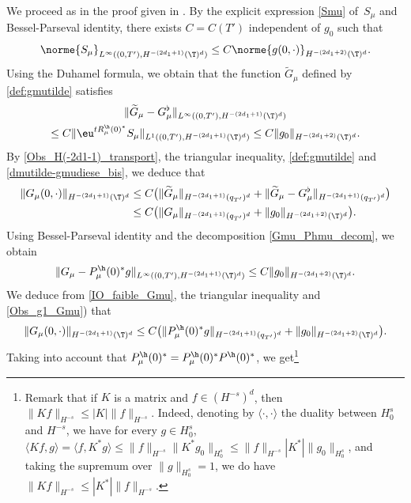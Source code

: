 We proceed as in the proof given in .
By the explicit expression \eqref{Smu} of~$S_\mu$ and Bessel-Parseval identity, there exists $C=C(T')$ independent of $g_0$ such that
\begin{equation}
\label{defsourcecompBis}
\norme{S_\mu}_{L^\infty((0,T'),H^{-(2d_1+1)}(\T)^d)} \leq C \norme{ g(0,\cdot)}_{H^{-(2d_1+2)}(\T)^d}.
\end{equation}
Using the Duhamel formula, we obtain that the function $\widetilde{G}_\mu$ defined by \eqref{def:gmutilde} satisfies
\begin{multline}
\| \widetilde{G}_\mu - G_\mu^\flat \|_{L^\infty((0,T'),H^{-(2d_1+1)}(\T)^d)}\\
\leq C \| \eu^{t R_{\mu}^{\h}(0)^*} S_\mu \|_{L^1((0,T'),H^{-(2d_1+1)}(\T)^d)} \leq C
\| g_0 \|_{H^{-(2d_1+2)}(\T)^d}.
\label{dmutilde-gmudiese_bis}
\end{multline}
By \eqref{Obs_H(-2d1-1)_transport}, the triangular inequality, \eqref{def:gmutilde} and \eqref{dmutilde-gmudiese_bis}, we deduce that
\begin{equation} \label{IO_faible_Gmu}
\begin{aligned}
\| G_\mu(0,\cdot) \|_{H^{-(2d_1+1)}(\T)^d}
& \leq C \bigl(\| \widetilde{G}_\mu \|_{H^{-(2d_1+1)}(q_{T'})^d} + \| \widetilde{G}_\mu - G_\mu^\flat \|_{H^{-(2d_1+1)}(q_{T'})^d} \bigr) \\
& \leq C \bigl(\|G_\mu\|_{H^{-(2d_1+1)}(q_{T'})^d}+ \| g_0 \|_{H^{-(2d_1+2)}(\T)^d}
\bigr).
\end{aligned}
\end{equation}
Using Bessel-Parseval identity and the decomposition \eqref{Gmu_Phmu_decom}, we obtain
\begin{equation} \label{Obs_g1_Gmu}
\|G_{\mu} -P^\h_\mu(0)^* g \|_{L^\infty((0,T'),H^{-(2d_1+1)}(\T)^d)} \leq C \| g_0\|_{H^{-(2d_1+2)}(\T)^d}.
\end{equation}
We deduce from \eqref{IO_faible_Gmu}, the triangular inequality and \eqref{Obs_g1_Gmu}) that
\[
\| G_\mu(0,\cdot) \|_{H^{-(2d_1+1)}(\T)^d} \leq C \bigl(
\| P^\h_\mu(0)^* g \|_{H^{-(2d_1+1)}(q_{T'})^d} + \| g_0\|_{H^{-(2d_1+2)}(\T)^d} \bigr).
\]
Taking into account that $P^\h_\mu(0)^*=P^\h_\mu(0)^* P^\h(0)^*$, we get\footnote{Remark that if $K$ is a matrix and $f\in (H^{-s})^d$, then $\|Kf\|_{H^{-s}}\leq |K|\|f\|_{H^{-s}}$. Indeed, denoting by $\langle\cdot,\cdot\rangle$ the duality between $H^s_0$ and $H^{-s}$, we have for every $g\in H^{s}_0$, $\langle Kf,g\rangle = \langle f, K^*g\rangle\leq \|f\|_{H^{-s}} \|K^* g_0\|_{H^s_0}\leq\|f\|_{H^{-s}}|K^*| \| g_0\|_{H^s_0} $, and taking the supremum over $\|g\|_{H^s_0} = 1$, we do have $\|Kf\|_{H^{-s}}\leq |K^*|\|f\|_{H^{-s}}$.}
